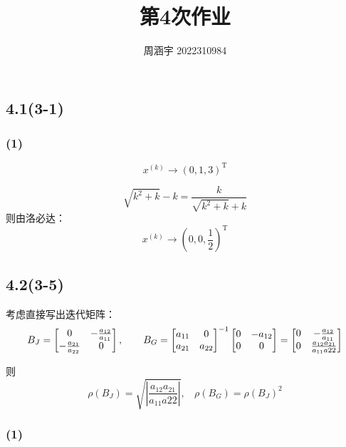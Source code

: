 \documentclass[UTF8,zihao=5]{ctexart}
\title{{\bfseries 第4次作业}}
\author{周涵宇 2022310984}
\date{}
\newcommand{\trans}[0]{^\mathrm{T}}
\begin{document}
\maketitle

\subsection*{4.1(3-1)}

\subsubsection*{(1)}

$$
    x^{(k)}\rightarrow (0, 1, 3)\trans
$$

$$
    \sqrt{k^2+k} - k = \frac{k}{\sqrt{k^2+k} + k}
$$
则由洛必达：
$$
    x^{(k)}\rightarrow (0, 0, \frac{1}{2})\trans
$$

\subsection*{4.2(3-5)}



考虑直接写出迭代矩阵：
$$
    B_J=\begin{bmatrix}
        0                      & -\frac{a_{12}}{a_{11}} \\
        -\frac{a_{21}}{a_{22}} & 0                      \\
    \end{bmatrix},\hspace*{2em}
    B_G=\begin{bmatrix}
        a_{11} & 0      \\
        a_{21} & a_{22} \\
    \end{bmatrix}^{-1}\begin{bmatrix}
        0 & -a_{12} \\
        0 & 0       \\
    \end{bmatrix}
    =
    \begin{bmatrix}
        0 & -\frac{a_{12}}{a_{11}}           \\
        0 & \frac{a_{12}a_{21}}{a_{11}a{22}} \\
    \end{bmatrix}
$$

则
$$
    \rho(B_J)=\sqrt{\left|\frac{a_{12}a_{21}}{a_{11}a{22}}\right|},
    \ \ \ \
    \rho(B_G)=\rho(B_J)^2
$$

\subsubsection*{(1)}
\end{document}
